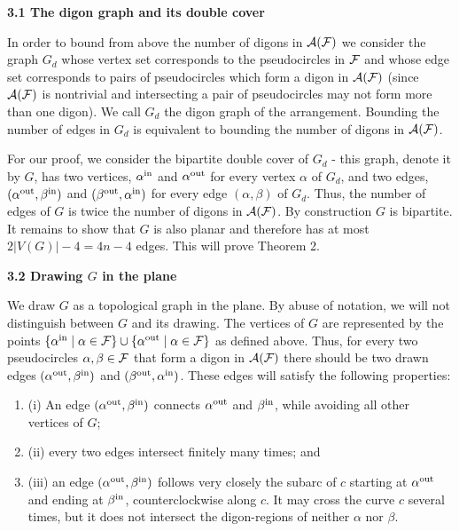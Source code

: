 \par\medskip\noindent\textbf{3.1 The digon graph and its double cover}\par
In order to bound from above the number of digons in ${\cal{A}}({\cal{F}})$ we consider the graph $G_{d}$ whose vertex set corresponds to the pseudocircles in ${\cal{F}}$ and whose edge set corresponds to pairs of pseudocircles which form a digon in ${\cal{A}}({\cal{F}})$ (since ${\cal{A}}({\cal{F}})$ is nontrivial and intersecting a pair of pseudocircles may not form more than one digon). We call $G_{d}$ the digon graph of the arrangement. Bounding the number of edges in $G_{d}$ is equivalent to bounding the number of digons in ${\cal{A}}({\cal{F}})$.
\par
\par
For our proof, we consider the bipartite double cover of $G_{d}$ - this graph, denote it by $G$, has two vertices, $\alpha^{\rm in}$ and $\alpha^{\rm out}$ for every vertex $\alpha$ of $G_{d}$, and two edges, $(\alpha^{\rm out},\beta^{\rm in})$ and $(\beta^{\rm out},\alpha^{\rm in})$ for every edge $(\alpha,\beta)$ of $G_{d}$. Thus, the number of edges of $G$ is twice the number of digons in ${\cal{A}}({\cal{F}})$. By construction $G$ is bipartite. It remains to show that $G$ is also planar and therefore has at most $2|V(G)|-4=4n-4$ edges. This will prove Theorem 2.
\par
\par
\par
\par\medskip\noindent\textbf{3.2 Drawing $G$ in the plane}\par
We draw $G$ as a topological graph in the plane. By abuse of notation, we will not distinguish between $G$ and its drawing. The vertices of $G$ are represented by the points $\{\alpha^{\rm in}\mid\alpha\in{\cal{F}}\}\cup\{\alpha^{\rm out}\mid\alpha\in{%
\cal{F}}\}$ as defined above. Thus, for every two pseudocircles $\alpha,\beta\in{\cal{F}}$ that form a digon in ${\cal{A}}({\cal{F}})$ there should be two drawn edges $(\alpha^{\rm out},\beta^{\rm in})$ and $(\beta^{\rm out},\alpha^{\rm in})$. These edges will satisfy the following properties:
\par
\begin{enumerate}
\item[]  (i) 
An edge $(\alpha^{\rm out},\beta^{\rm in})$ connects $\alpha^{\rm out}$ and $\beta^{\rm in}$, while avoiding all other vertices of $G$;
\par
\par
\item[]  (ii) 
every two edges intersect finitely many times; and
\par
\par
\item[]  (iii) 
an edge $(\alpha^{\rm out},\beta^{\rm in})$ follows very closely the subarc of $c$ starting at $\alpha^{\rm out}$ and ending at $\beta^{\rm in}$, counterclockwise along $c$. It may cross the curve $c$ several times, but it does not intersect the digon-regions of neither $\alpha$ nor $\beta$.
\par
\par
\end{enumerate}
